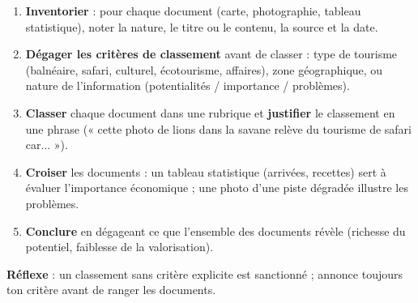 \documentclass[11pt]{article}
\begin{document}
\begin{methode}
\begin{enumerate}
\item \textbf{Inventorier} : pour chaque document (carte, photographie, tableau statistique), noter la nature, le titre ou le contenu, la source et la date.
\item \textbf{Dégager les critères de classement} avant de classer : type de tourisme (balnéaire, safari, culturel, écotourisme, affaires), zone géographique, ou nature de l'information (potentialités / importance / problèmes).
\item \textbf{Classer} chaque document dans une rubrique et \textbf{justifier} le classement en une phrase (« cette photo de lions dans la savane relève du tourisme de safari car... »).
\item \textbf{Croiser} les documents : un tableau statistique (arrivées, recettes) sert à évaluer l'importance économique ; une photo d'une piste dégradée illustre les problèmes.
\item \textbf{Conclure} en dégageant ce que l'ensemble des documents révèle (richesse du potentiel, faiblesse de la valorisation).
\end{enumerate}
\textbf{Réflexe} : un classement sans critère explicite est sanctionné ; annonce toujours ton critère avant de ranger les documents.
\end{methode}
\end{document}
